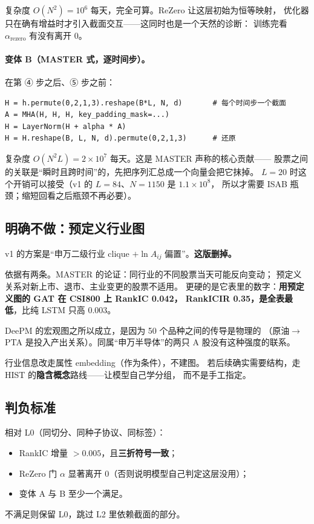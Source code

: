 \documentclass[11pt, a4paper]{ctexart}
\begin{document}
复杂度 $O(N^2) = 10^6$ 每天，完全可算。ReZero 让这层初始为恒等映射，
优化器只在确有增益时才引入截面交互——这同时也是一个天然的诊断：
训练完看 $\alpha_{\text{rezero}}$ 有没有离开 0。

\paragraph{变体 B（MASTER 式，逐时间步）。}在第 ④ 步之后、⑤ 步之前：

\begin{lstlisting}
H = h.permute(0,2,1,3).reshape(B*L, N, d)       # 每个时间步一个截面
A = MHA(H, H, H, key_padding_mask=...)
H = LayerNorm(H + alpha * A)
H = H.reshape(B, L, N, d).permute(0,2,1,3)      # 还原
\end{lstlisting}

复杂度 $O(N^2 L) = 2\times10^7$ 每天。这是 MASTER 声称的核心贡献——
股票之间的关联是“瞬时且跨时间”的，先把序列汇总成一个向量会把它抹掉。
$L{=}20$ 时这个开销可以接受（v1 的 $L{=}84$、$N{=}1150$ 是 $1.1\times10^8$，
所以才需要 ISAB 瓶颈；缩短回看之后瓶颈不再必要）。

\subsection{明确不做：预定义行业图}

\begin{warnbox}
v1 的方案是“申万二级行业 clique $+ \ln A_{ij}$ 偏置”。\textbf{这版删掉。}

依据有两条。MASTER 的论证：同行业的不同股票当天可能反向变动；
预定义关系对新上市、退市、主业变更的股票不适用。
更硬的是它表里的数字：\textbf{用预定义图的 GAT 在 CSI800 上 RankIC 0.042，
RankICIR 0.35，是全表最低}，比纯 LSTM 只高 0.003。

DeePM 的宏观图之所以成立，是因为 50 个品种之间的传导是物理的
（原油$\to$PTA 是投入产出关系）。同属“申万半导体”的两只 A 股没有这种强度的联系。

行业信息改走属性 embedding（作为条件），不建图。
若后续确实需要结构，走 HIST 的\textbf{隐含概念}路线——让模型自己学分组，
而不是手工指定。
\end{warnbox}

\subsection{判负标准}
相对 L0（同切分、同种子协议、同标签）：
\begin{itemize}
  \item RankIC 增量 $> 0.005$，且\textbf{三折符号一致}；
  \item ReZero 门 $\alpha$ 显著离开 0（否则说明模型自己判定这层没用）；
  \item 变体 A 与 B 至少一个满足。
\end{itemize}
不满足则保留 L0，跳过 L2 里依赖截面的部分。
\end{document}
